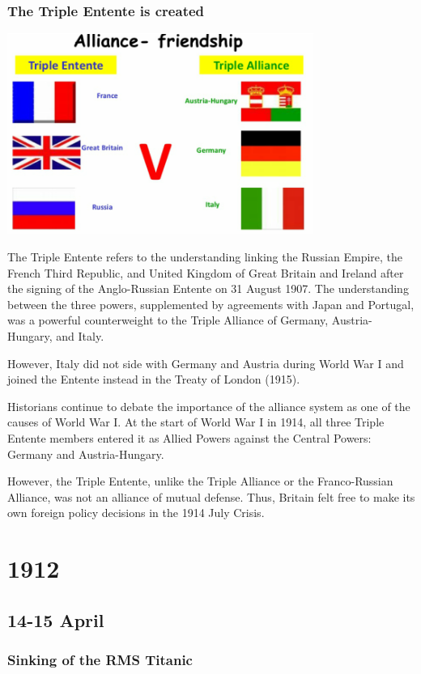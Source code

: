 \documentclass[11pt]{report}
\begin{document}
\subsection{The Triple Entente is created}
\vspace{2mm}\begin{center}\includegraphics[width=10cm]{./img/tripleEntente.png}\end{center}
The Triple Entente refers to the understanding linking the Russian Empire, the French Third Republic, and United Kingdom of Great Britain and Ireland after the signing of the Anglo-Russian Entente on 31 August 1907. The understanding between the three powers, supplemented by agreements with Japan and Portugal, was a powerful counterweight to the Triple Alliance of Germany, Austria-Hungary, and Italy.

However, Italy did not side with Germany and Austria during World War I and joined the Entente instead in the Treaty of London (1915).

Historians continue to debate the importance of the alliance system as one of the causes of World War I. At the start of World War I in 1914, all three Triple Entente members entered it as Allied Powers against the Central Powers: Germany and Austria-Hungary.

However, the Triple Entente, unlike the Triple Alliance or the Franco-Russian Alliance, was not an alliance of mutual defense. Thus, Britain felt free to make its own foreign policy decisions in the 1914 July Crisis.

\chapter{1912}
\section{14-15 April}
\subsection{Sinking of the RMS Titanic}
\end{document}
